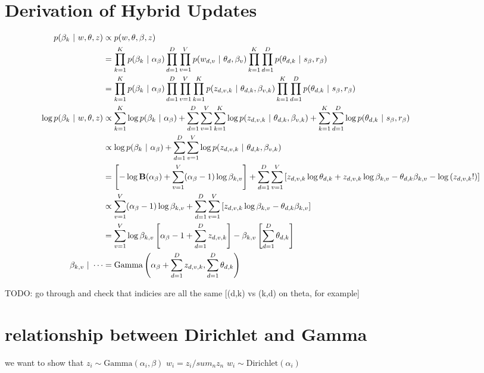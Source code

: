 \documentclass[11pt,letterpaper]{article}
\begin{document}
\section{Derivation of Hybrid Updates}
\begin{align}
p(\beta_k ~\vert~ w, \theta, z) &\propto  p(w, \theta, \beta, z) \\
&= \prod_{k=1}^K p(\beta_k ~\vert~ \alpha_\beta) \prod_{d=1}^D\prod_{v=1}^V p(w_{d,v} ~\vert~ \theta_d, \beta_v)  \prod_{k=1}^K \prod_{d=1}^D p(\theta_{d,k} ~\vert~ s_\beta, r_\beta) \\
&= \prod_{k=1}^K p(\beta_k ~\vert~ \alpha_\beta) \prod_{d=1}^D\prod_{v=1}^V \prod_{k=1}^K p(z_{d,v,k} ~\vert~ \theta_{d,k}, \beta_{v,k})  \prod_{k=1}^K \prod_{d=1}^D p(\theta_{d,k} ~\vert~ s_\beta, r_\beta) \\
\log p(\beta_k ~\vert~ w, \theta, z) &\propto \sum_{k=1}^K \log p(\beta_k ~\vert~ \alpha_\beta) + \sum_{d=1}^D\sum_{v=1}^V \sum_{k=1}^K \log p(z_{d,v,k} ~\vert~ \theta_{d,k}, \beta_{v,k}) + \sum_{k=1}^K \sum_{d=1}^D \log p(\theta_{d,k} ~\vert~ s_\beta, r_\beta) \\
&\propto \log p(\beta_k ~\vert~ \alpha_\beta) + \sum_{d=1}^D\sum_{v=1}^V \log p(z_{d,v,k} ~\vert~ \theta_{d,k}, \beta_{v,k}) \\
&= \left[ - \log\mathbf{B}(\alpha_\beta) + \sum_{v=1}^V (\alpha_\beta -1)\log \beta_{k,v}\right] + \sum_{d=1}^D\sum_{v=1}^V \left[ z_{d,v,k} \log\theta_{d,k} + z_{d,v,k} \log\beta_{k,v} - \theta_{d,k}\beta_{k,v} - \log\left(z_{d,v,k}!\right)\right] \\
&\propto \sum_{v=1}^V (\alpha_\beta -1)\log \beta_{k,v} + \sum_{d=1}^D\sum_{v=1}^V \left[ z_{d,v,k} \log\beta_{k,v} - \theta_{d,k}\beta_{k,v} \right] \\
&= \sum_{v=1}^V \log \beta_{k,v} \left[ \alpha_\beta - 1 + \sum_{d=1}^D z_{d,v,k}\right] - \beta_{k,v} \left[\sum_{d=1}^D\theta_{d,k}\right] \\
\beta_{k,v} ~\vert~ \cdots &= \mbox{Gamma}\left(\alpha_\beta + \sum_{d=1}^D z_{d,v,k}, \sum_{d=1}^D\theta_{d,k}\right)
\end{align}


TODO: go through and check that indicies are all the same [(d,k) vs (k,d) on theta, for example]


\section{relationship between Dirichlet and Gamma}
we want to show that $z_i \sim \mbox{Gamma}(\alpha_i, \beta)$
$w_i = z_i / sum_n z_n$
$w_i \sim \mbox{Dirichlet}(\alpha_i)$
\end{document}
